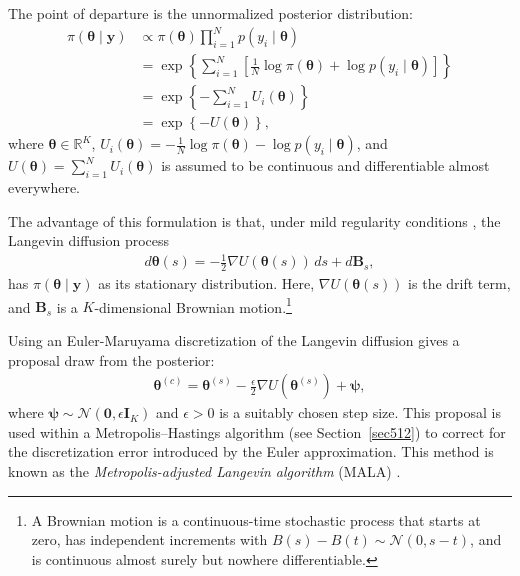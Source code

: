 The point of departure is the unnormalized posterior distribution:
\begin{align*}
	\pi(\boldsymbol{\theta} \mid \mathbf{y}) &\propto \pi(\boldsymbol{\theta}) \prod_{i=1}^{N} p(y_i \mid \boldsymbol{\theta}) \\
	&= \exp\left\{ \sum_{i=1}^N \left[ \frac{1}{N} \log \pi(\boldsymbol{\theta}) + \log p(y_i \mid \boldsymbol{\theta}) \right] \right\} \\
	&= \exp\left\{ -\sum_{i=1}^N U_i(\boldsymbol{\theta}) \right\} \\
	&= \exp\left\{ -U(\boldsymbol{\theta}) \right\},
\end{align*}
where \( \boldsymbol{\theta} \in \mathbb{R}^K \), \( U_i(\boldsymbol{\theta}) = -\frac{1}{N} \log \pi(\boldsymbol{\theta}) - \log p(y_i \mid \boldsymbol{\theta}) \), and \( U(\boldsymbol{\theta}) = \sum_{i=1}^N U_i(\boldsymbol{\theta}) \) is assumed to be continuous and differentiable almost everywhere.  

The advantage of this formulation is that, under mild regularity conditions \cite{roberts1996exponential}, the Langevin diffusion process
\begin{align*}
	d\boldsymbol{\theta}(s) = -\frac{1}{2} \nabla U(\boldsymbol{\theta}(s))\,ds + d\mathbf{B}_s,
\end{align*}
has \( \pi(\boldsymbol{\theta} \mid \mathbf{y}) \) as its stationary distribution. Here, \( \nabla U(\boldsymbol{\theta}(s)) \) is the drift term, and \( \mathbf{B}_s \) is a \( K \)-dimensional Brownian motion.\footnote{A Brownian motion is a continuous-time stochastic process that starts at zero, has independent increments with \( B(s) - B(t) \sim \mathcal{N}(0, s - t) \), and is continuous almost surely but nowhere differentiable.}

Using an Euler-Maruyama discretization of the Langevin diffusion gives a proposal draw from the posterior:
\begin{align*}
	\boldsymbol{\theta}^{(c)} = \boldsymbol{\theta}^{(s)} - \frac{\epsilon}{2} \nabla U(\boldsymbol{\theta}^{(s)}) + \boldsymbol{\psi},
\end{align*}
where \( \boldsymbol{\psi} \sim \mathcal{N}(\mathbf{0}, \epsilon \mathbf{I}_K) \) and \( \epsilon > 0 \) is a suitably chosen step size. This proposal is used within a Metropolis–Hastings algorithm (see Section~\ref{sec512}) to correct for the discretization error introduced by the Euler approximation. This method is known as the \textit{Metropolis-adjusted Langevin algorithm} (MALA) \cite{roberts1996exponential}. 

